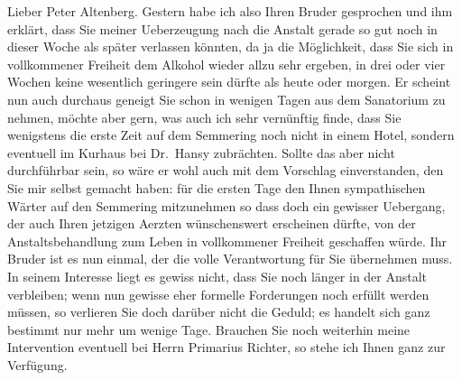 \pstart\center{}Lieber Peter Altenberg.\pend\vspace{0.5em}
\pstart
           Gestern habe ich also Ihren Bruder gesprochen und ihm erklärt, dass Sie meiner Ueberzeugung nach die
               Anstalt gerade so gut noch in dieser Woche als später verlassen könnten, da ja die
               Möglichkeit, dass Sie sich in vollkommener Freiheit dem Alkohol wieder allzu sehr
               ergeben, in drei oder vier Wochen keine wesentlich geringere sein dürfte als heute
               oder morgen. Er scheint nun auch durchaus geneigt Sie schon in wenigen Tagen aus dem
                  Sanatorium zu nehmen, möchte
               aber gern, was auch ich sehr vernünftig finde, dass Sie wenigstens die erste Zeit auf
               dem Semmering noch nicht in einem Hotel, sondern
               eventuell im Kurhaus bei Dr. Hansy zubrächten. Sollte das aber nicht durchführbar sein, so
               wäre er wohl auch mit dem Vorschlag einverstanden, den Sie mir selbst gemacht haben:
               für die ersten Tage den Ihnen sympathischen Wärter auf den Semmering mitzunehmen {\pb}so dass doch ein gewisser
               Uebergang, der auch Ihren jetzigen Aerzten wünschenswert erscheinen dürfte, von der
               Anstaltsbehandlung zum Leben in vollkommener Freiheit geschaffen würde. Ihr Bruder ist es nun einmal, der
               die volle Verantwortung für Sie übernehmen muss. In seinem Interesse liegt es gewiss
               nicht, dass Sie noch länger in der Anstalt verbleiben; wenn nun gewisse eher formelle
               Forderungen noch erfüllt werden müssen, so verlieren Sie doch darüber nicht die
               Geduld; es handelt sich ganz bestimmt nur mehr um wenige Tage. Brauchen Sie noch
               weiterhin meine Intervention eventuell bei Herrn Primarius Richter, so stehe ich Ihnen ganz zur Verfügung.\pend
           
